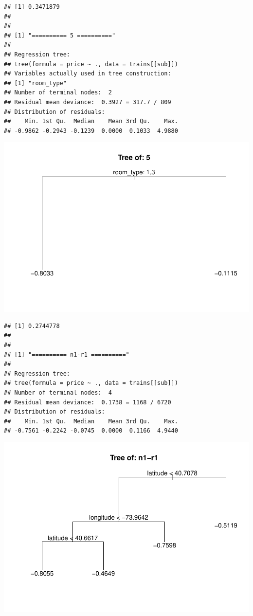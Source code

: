 \documentclass[
]{article}
\begin{document}
\begin{verbatim}
## [1] 0.3471879
## 
## 
## [1] "========== 5 =========="
## 
## Regression tree:
## tree(formula = price ~ ., data = trains[[sub]])
## Variables actually used in tree construction:
## [1] "room_type"
## Number of terminal nodes:  2 
## Residual mean deviance:  0.3927 = 317.7 / 809 
## Distribution of residuals:
##    Min. 1st Qu.  Median    Mean 3rd Qu.    Max. 
## -0.9862 -0.2943 -0.1239  0.0000  0.1033  4.9880
\end{verbatim}

\includegraphics{project-code_files/figure-latex/unnamed-chunk-14-5.pdf}

\begin{verbatim}
## [1] 0.2744778
## 
## 
## [1] "========== n1-r1 =========="
## 
## Regression tree:
## tree(formula = price ~ ., data = trains[[sub]])
## Number of terminal nodes:  4 
## Residual mean deviance:  0.1738 = 1168 / 6720 
## Distribution of residuals:
##    Min. 1st Qu.  Median    Mean 3rd Qu.    Max. 
## -0.7561 -0.2242 -0.0745  0.0000  0.1166  4.9440
\end{verbatim}

\includegraphics{project-code_files/figure-latex/unnamed-chunk-14-6.pdf}
\end{document}
